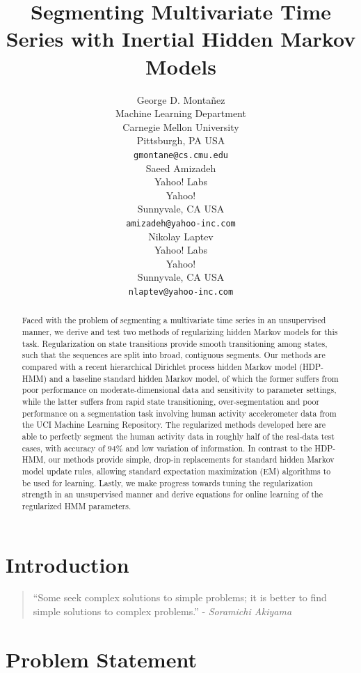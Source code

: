 \documentclass[letterpaper]{article}
\title{Segmenting Multivariate Time Series with Inertial Hidden Markov Models}
\author{George D. Monta\~nez \\
Machine Learning Department\\
Carnegie Mellon University\\
Pittsburgh, PA USA\\
\texttt{gmontane@cs.cmu.edu} \\
\And
Saeed Amizadeh\\
Yahoo! Labs\\
Yahoo!\\
Sunnyvale, CA USA\\
\texttt{amizadeh@yahoo-inc.com}\\
\And
Nikolay Laptev\\
Yahoo! Labs\\
Yahoo!\\
Sunnyvale, CA USA\\
\texttt{nlaptev@yahoo-inc.com}}
\newenvironment{dedication}
        {\vspace{0.0ex}\begin{quotation}\begin{center}\begin{em}}
        {\par\end{em}\end{center}\end{quotation}}
\begin{document}
\maketitle

\begin{abstract}
    Faced with the problem of segmenting a multivariate time series in an unsupervised manner, we derive and test two methods of regularizing hidden Markov models for this task. Regularization on state transitions provide smooth transitioning among states, such that the sequences are split into broad, contiguous segments. Our methods are compared with a recent hierarchical Dirichlet process hidden Markov model (HDP-HMM) and a baseline standard hidden Markov model, of which the former suffers from poor performance on moderate-dimensional data and sensitivity to parameter settings, while the latter suffers from rapid state transitioning, over-segmentation and poor performance on a segmentation task involving human activity accelerometer data from the UCI Machine Learning Repository. The regularized methods developed here are able to perfectly segment the human activity data in roughly half of the real-data test cases, with accuracy of 94\% and low variation of information. In contrast to the HDP-HMM, our methods provide simple, drop-in replacements for standard hidden Markov model update rules, allowing standard expectation maximization (EM) algorithms to be used for learning. Lastly, we make progress towards tuning the regularization strength in an unsupervised manner and derive equations for online learning of the regularized HMM parameters.
\end{abstract}

\section{Introduction}
\begin{dedication} ``Some seek complex solutions to simple problems; it is better to find simple solutions to complex problems.'' - \emph{Soramichi Akiyama}
\end{dedication}



\section{Problem Statement}
\end{document}
